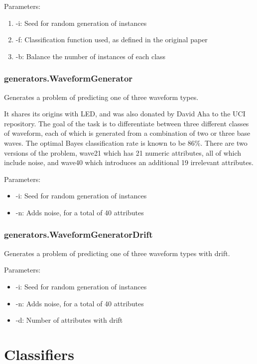 \documentclass[a4paper,12pt,twoside]{book}
\begin{document}
Parameters:
\begin{enumerate}
\item -i: Seed for random generation of instances
\item -f: Classification function used, as defined in the original paper
\item -b: Balance the number of instances of each class\end{enumerate}



\subsection{generators.WaveformGenerator} Generates a problem of predicting one of three waveform types.

It shares its origins with LED, and was also donated by David Aha
to the UCI repository. The goal of the task is to differentiate between three
different classes of waveform, each of which is generated from a combination
of two or three base waves. The optimal Bayes classification rate is known
to be 86\%. There are two versions of the problem, wave21 which has 21 numeric
attributes, all of which include noise, and wave40 which introduces an additional 19
irrelevant attributes.

Parameters:
\begin{itemize}
\item -i: Seed for random generation of instances
\item -n: Adds noise, for a total of 40 attributes
\end{itemize}

\subsection{generators.WaveformGeneratorDrift} Generates a problem of predicting one of three waveform types with drift.

Parameters:
\begin{itemize}
\item -i: Seed for random generation of instances
\item -n: Adds noise, for a total of 40 attributes
\item -d: Number of attributes with drift\end{itemize}

\chapter{Classifiers}
\end{document}

